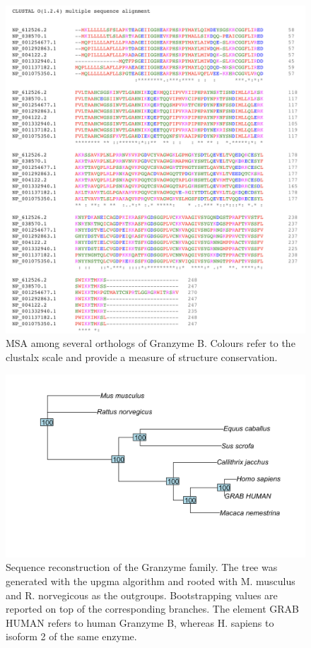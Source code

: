 \documentclass[
]{article}
\begin{document}
\begin{figure}

{\centering \includegraphics[width=0.6\linewidth]{MSA/msa_clustal_omega} 

}

\caption{MSA among several orthologs of Granzyme B. Colours refer to the clustalx scale and provide a measure of structure conservation.}\label{fig:Fig4a}
\end{figure}

\begin{figure}

{\centering \includegraphics[width=0.8\linewidth]{sequence reconstruction/phylotree_mus} 

}

\caption{Sequence reconstruction of the Granzyme family. The tree was generated with the upgma algorithm and rooted with M. musculus and R. norvegicous as the outgroups. Bootstrapping values are reported on top of the corresponding branches. The element GRAB HUMAN refers to human Granzyme B, whereas H. sapiens to isoform 2 of the same enzyme.}\label{fig:Fig4b}
\end{figure}
\end{document}
